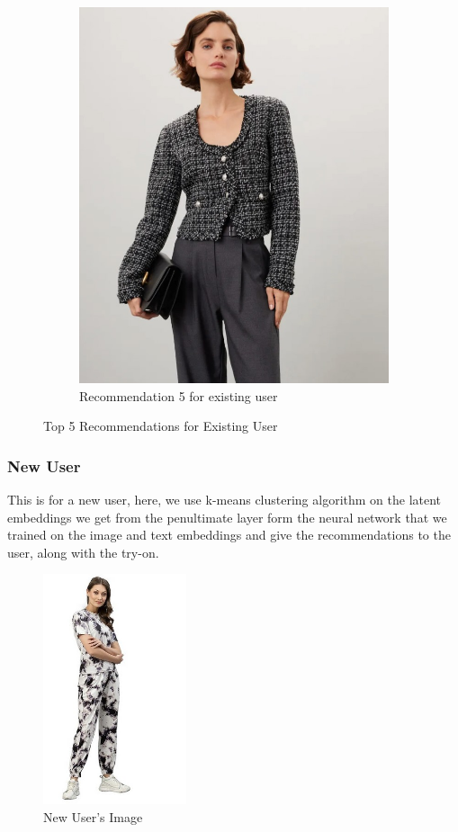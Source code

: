 \documentclass[conference]{IEEEtran}
\begin{document}
\begin{figure}[!htbp]
\begin{subfigure}[b]{0.3\textwidth}
    \includegraphics[width=\textwidth]{r5.jpg}
    \caption{Recommendation 5 for existing user}
    \label{fig:Recommendations5}
  \end{subfigure}
  \caption{Top 5 Recommendations for Existing User}
  \label{fig:AllRecommendations}
\end{figure}
\newpage
\subsubsection{New User}
This is for a new user, here, we use k-means clustering algorithm on the latent embeddings we get from the penultimate layer form the neural network that we trained on the image and text embeddings and give the recommendations to the user, along with the try-on.

\begin{figure}[!htbp]
  \centering
  \includegraphics[width=0.375\textwidth]{new1.jpg}
  \caption{New User's Image}
  \label{fig:New User}
\end{figure}
\end{document}
